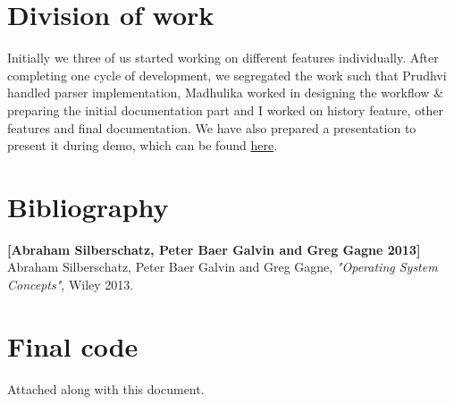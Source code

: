 \documentclass[12pt,twoside]{article}
\begin{document}
\section{Division of work}
Initially we three of us started working on different features individually. After completing one cycle of development, we segregated the work such that Prudhvi handled parser implementation, Madhulika worked in designing the workflow \& preparing the initial documentation part and I worked on history feature, other features and final documentation. We have also prepared a presentation to present it during demo, which can be found \href{http://prezi.com/io76sy9tsvnq/}{here}.\\

\section{Bibliography}

\textbf{[Abraham Silberschatz, Peter Baer Galvin and Greg Gagne 2013]} Abraham Silberschatz, Peter Baer Galvin and Greg Gagne, \emph{"Operating System Concepts"}, Wiley 2013.\\


\section{Final code}
Attached along with this document.
\end{document}
